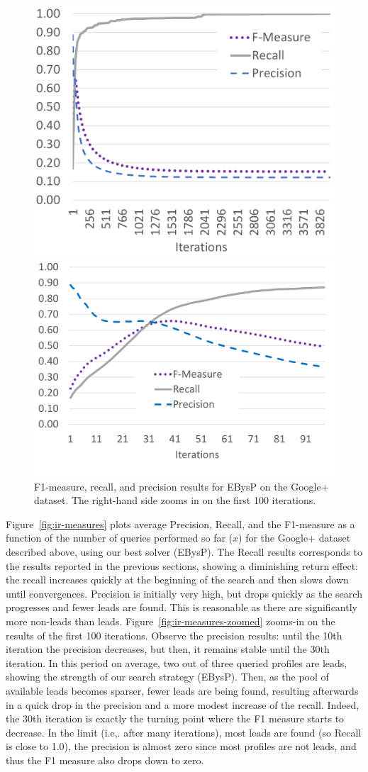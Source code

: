 \documentclass[journal]{IEEEtran}
\newcommand{\newstuff}[1]{#1}
\begin{document}
\begin{figure}[t]
\centering
\begin{subfloat}[\label{fig:ir-measures}]%
\centering
\includegraphics[width=0.4\linewidth]{tonic-ir-measures.pdf}
\end{subfloat}
\qquad
\begin{subfloat}[\label{fig:ir-measures-zoomed}]
\centering
\includegraphics[width=0.4\linewidth]{tonic-ir-measures-zoomed.pdf}%
\end{subfloat}%
\caption{F1-measure, recall, and precision results for EBysP on the Google+ dataset. The right-hand side zooms in on the first 100 iterations.}
\end{figure}

\newstuff{
Figure~\ref{fig:ir-measures} plots average Precision, Recall, and the F1-measure 
as a function of the number of queries performed so far ($x$) for the Google+ 
dataset described above, using our best solver (EBysP). 
The Recall results corresponds to the results reported in the previous sections, showing a diminishing return effect: the recall increases quickly at the beginning of the search and then slows down until convergences.  
Precision is initially very high, but drops quickly as the search progresses and fewer leads are found. This is reasonable as there are significantly more non-leads than leads. 
Figure~\ref{fig:ir-measures-zoomed} zooms-in on the results of the first 100 iterations. 
Observe the precision results: until the 10th iteration the precision decreases, but then, it remains stable until the 30th iteration. 
In this period on average, two out of three queried profiles are leads, showing the strength of our search strategy (EBysP). Then, as the pool of available leads becomes sparser, fewer leads are being found, resulting afterwards in a quick drop in the precision and
a more modest increase of the recall. Indeed, the 30th iteration is exactly the turning point where the F1 measure starts to decrease. In the limit (i.e,. after many iterations), most leads are found (so Recall is close to 1.0), the precision is almost zero since most profiles are not leads, and thus the F1 measure also drops down to zero.} 
\end{document}
